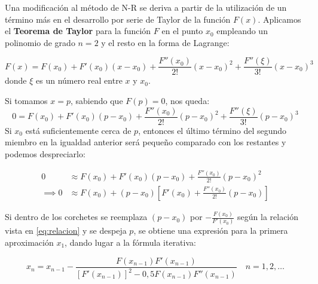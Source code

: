 \documentclass[openany]{book}
\begin{document}
Una modificación al método de N-R se deriva a partir de la utilización de un término más en el desarrollo por serie de Taylor de la función \(F(x)\). Aplicamos el \textbf{Teorema de Taylor} para la función \(F\) en el punto \(x_0\) empleando un polinomio de grado \(n=2\) y el resto en la forma de Lagrange:

\[F(x) = F(x_0) + F'(x_0)(x-x_0) + \frac{F''(x_0)}{2!}(x-x_0)^2 + \frac{F''(\xi)}{3!}(x-x_0)^3\]
donde \(\xi\) es un número real entre \(x\) y \(x_0\).

Si tomamos \(x = p\), sabiendo que \(F(p) = 0\), nos queda:
\[0 = F(x_0) + F'(x_0)(p-x_0) + \frac{F''(x_0)}{2!}(p-x_0)^2 + \frac{F''(\xi)}{3!}(p-x_0)^3\]
Si \(x_0\) está suficientemente cerca de \(p\), entonces el último término del segundo miembro en la igualdad anterior será pequeño comparado con los restantes y podemos despreciarlo:

\begin{equation*} 
\begin{split}
0 & \approx F(x_0) + F'(x_0)(p-x_0) + \frac{F''(x_0)}{2!}(p-x_0)^2 \\
\implies 0 & \approx F(x_0) + (p-x_0) \left[ F'(x_0) + \frac{F''(x_0)}{2!}(p-x_0) \right]
\end{split}
\end{equation*}

Si dentro de los corchetes se reemplaza \((p - x_0)\) por \(- \frac{F(x_0)}{F'(x_0)}\) según la relación vista en \eqref{eq:relacion} y se despeja \(p\), se obtiene una expresión para la primera aproximación \(x_1\), dando lugar a la fórmula iterativa:

\[
x_n = x_{n-1} - \frac{F(x_{n-1})F'(x_{n-1})}{[F'(x_{n-1})]^2 - 0,5 F(x_{n-1}) F''(x_{n-1})} \quad n = 1, 2, \dots
\]
\end{document}
